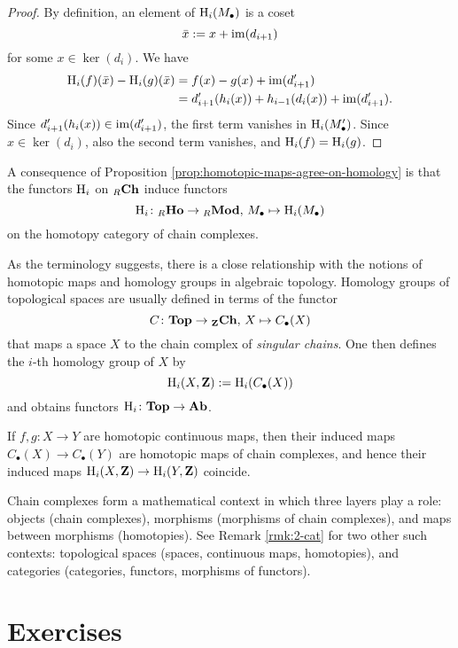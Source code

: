 \begin{proof}
By definition, an element of ${\mathrm H}_i(M_\bullet)$ is a coset
\[
	 \bar{x} := x + \operatorname{im}(d_{i+1})
\]
for some  $x\in \ker(d_i)$. We have
\begin{align*}
	{\mathrm H}_i(f)(\bar{x}) - {\mathrm H}_i(g)(\bar{x}) &=  f(x) - g(x) + \operatorname{im} (d'_{i+1})  \\
	&= d'_{i+1}(h_i(x)) + h_{i-1}(d_i(x))  +  \operatorname{im} (d'_{i+1}).
\end{align*}
Since $d'_{i+1}(h_i(x))  \in \operatorname{im}(d'_{i+1})$, the first term vanishes in ${\mathrm H}_i(M'_\bullet)$. Since $x\in \ker(d_i)$, also the second term vanishes, and  ${\mathrm H}_i(f)={\mathrm H}_i(g)$.
\end{proof}

A consequence of Proposition \ref{prop:homotopic-maps-agree-on-homology} is that the functors ${\mathrm H}_i$ on ${}_R\mathbf{Ch}$ induce  functors
\[
	{\mathrm H}_i\colon {}_R\mathbf{Ho} \to {}_R\mathbf{Mod},\, M_\bullet \mapsto {\mathrm H}_i(M_\bullet)
\]
on the homotopy category of chain complexes.

\begin{remark}As the terminology suggests, there is a close relationship with the notions of homotopic maps and homology groups in algebraic topology. Homology groups of topological spaces are usually defined in terms of the functor
\[
	C\colon \mathbf{Top} \to {}_{\mathbf{Z}}\mathbf{Ch},\, X \mapsto C_\bullet(X)
\]
that maps a space $X$ to the chain complex of \emph{singular chains}. One then defines the
$i$-th homology group of $X$ by
\[
	{\mathrm H}_i(X,{\mathbf{Z}}) := {\mathrm H}_i(C_\bullet(X))
\]
and obtains functors ${\mathrm H}_i\colon \mathbf{Top} \to \mathbf{Ab}$. 

If $f,g\colon X\to Y$ are homotopic continuous maps, then their induced maps $C_\bullet(X) \to C_\bullet(Y)$ are homotopic maps of chain complexes, and hence their induced maps ${\mathrm H}_i(X,{\mathbf{Z}}) \to {\mathrm H}_i(Y,{\mathbf{Z}})$ coincide.
\end{remark}

\begin{remark}
Chain complexes form a mathematical context in which three layers play a role: objects (chain complexes), morphisms (morphisms of chain complexes), and maps between morphisms (homotopies). See Remark \ref{rmk:2-cat} for two other such contexts: topological spaces (spaces, continuous maps, homotopies), and categories (categories, functors, morphisms of functors).
\end{remark}


\newpage
\section*{Exercises}

